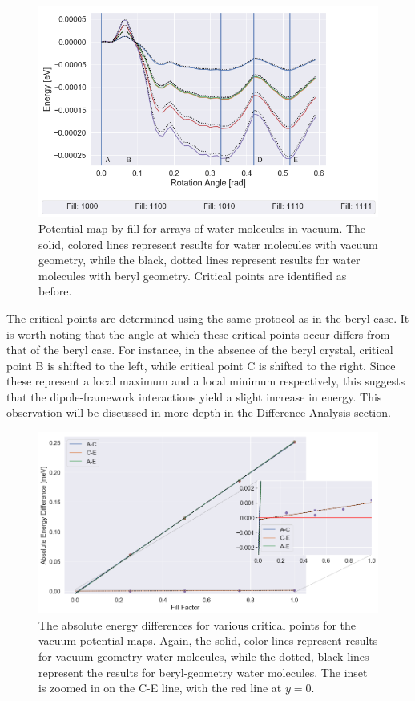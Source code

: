         \begin{figure}
            \centering
            \includegraphics[width=0.9\linewidth]{Figures/System/pmap_vacuum_comparison.png}
            \caption{Potential map by fill for arrays of water molecules in vacuum. The solid, colored lines represent results for water molecules with vacuum geometry, while the black, dotted lines represent results for water molecules with beryl geometry. Critical points are identified as before.}
            \label{fig:pmap_vacuum_comparison}
        \end{figure}
        
        The critical points are determined using the same protocol as in the beryl case. It is worth noting that the angle at which these critical points occur differs from that of the beryl case. For instance, in the absence of the beryl crystal, critical point B is shifted to the left, while critical point C is shifted to the right. Since these represent a local maximum and a local minimum respectively, this suggests that the dipole-framework interactions yield a slight increase in energy. This observation will be discussed in more depth in the Difference Analysis section.
        
        \begin{figure}
            \centering
            \includegraphics[width=0.9\linewidth]{Figures/System/pmap_vacuum_cps.png}
            \caption{The absolute energy differences for various critical points for the vacuum potential maps. Again, the solid, color lines represent results for vacuum-geometry water molecules, while the dotted, black lines represent the results for beryl-geometry water molecules. The inset is zoomed in on the C-E line, with the red line at $y=0$.}
            \label{fig:pmap_vaccum_cps}
        \end{figure}
        
